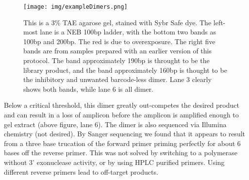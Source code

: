 \vspace{2em}

\begin{figure}[h!]
  \centering
  \texttt{[image: img/exampleDimers.png]}
  \caption{This is a 3\% TAE agarose gel, stained with Sybr Safe dye.
    The left-most lane is a NEB 100bp ladder, with the bottom 
    two bands as 100bp and 200bp. The red is due to overexposure.
    The right five bands are from samples prepared with an earlier
    version of this protocol. The band approximately 190bp is
    throught to be the library product, and the band approximately
    160bp is thought to be the inhibitory and unwanted 
    barcode-less dimer. Lane 3 clearly shows both bands, while lane
    6 is all dimer.}
  \label{fig:dimer}
\end{figure}

Below a critical threshold, this dimer greatly out-competes the desired
product and can result in a loss of amplicon before the amplicon is
amplified enough to gel extract (above figure, lane 6). The dimer is
also sequenced via Illumina chemistry (not desired). By Sanger
sequencing we found that it appears to result from a three base
trucation of the forward primer priming perfectly for about 6 bases off
the reverse primer. This was not solved by switching to a polymerase
without 3' exonuclease activity, or by using HPLC purified primers.
Using different reverse primers lead to off-target products.

